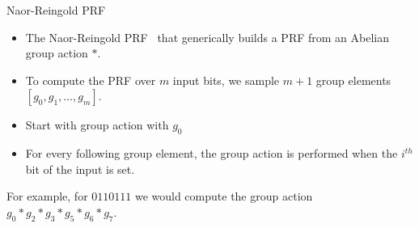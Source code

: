 \documentclass[aspectratio=169, 12pt,handout]{beamer}
\begin{document}

\begin{frame}{Naor-Reingold PRF~\cite{NaoRei04}}
  \begin{itemize}
    \item The Naor-Reingold PRF~\cite{NaoRei04} that generically builds a PRF
      from an Abelian group action $*$.
      \item
      To compute the PRF over $m$ input bits, we sample $m+1$ group elements $[g_0,
      g_1, \ldots, g_m]$. \pause
    \item Start with group action with $g_0$\pause
    \item For every following
      group element, the group action is performed when the $i^{th}$ bit of the input is set. \pause
  \end{itemize}
  \begin{example}
    For example, for $0110111$ we would
    compute the group action $g_0*g_2*g_3*g_5*g_6*g_7$.
  \end{example}
\end{frame}

\end{document}
